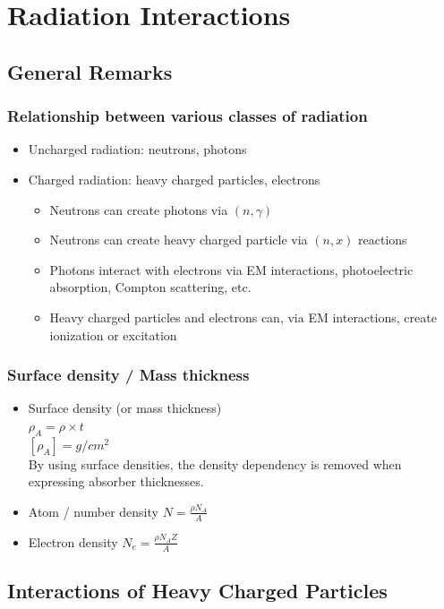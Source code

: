 \section{Radiation Interactions}
\subsection{General Remarks}
\subsubsection{Relationship between various classes of radiation}
\begin{itemize}
    \item Uncharged radiation: neutrons, photons
    \item Charged radiation: heavy charged particles, electrons
    \begin{itemize}
        \item Neutrons can create photons via $(n,\gamma)$
        \item Neutrons can create heavy charged particle via $(n,x)$ reactions
        \item Photons interact with electrons via EM interactions, photoelectric absorption, Compton scattering, etc.
        \item Heavy charged particles and electrons can, via EM interactions, create ionization or excitation 
    \end{itemize}
\end{itemize}
\subsubsection{Surface density / Mass thickness}
\begin{itemize}
    \item Surface density (or mass thickness)\\
    $\rho_A=\rho\times t$\\
    $[\rho_A]=g/cm^2$\\
    By using surface densities, the density dependency is removed when expressing absorber thicknesses.
    \item Atom / number density $N=\frac{\rho N_A}{A}$
    \item Electron density $N_e=\frac{\rho N_A Z}{A}$
\end{itemize}
\subsection{Interactions of Heavy Charged Particles}
